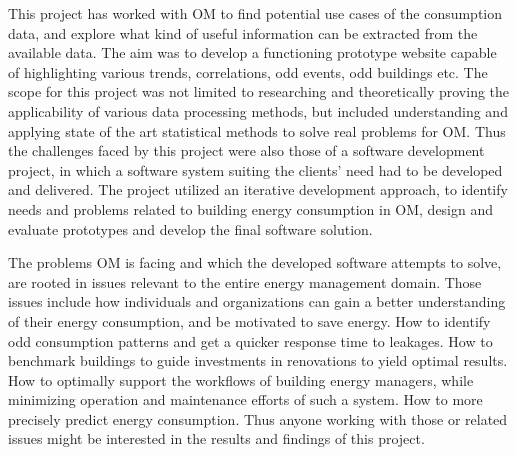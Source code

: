 This project has worked with OM to find potential use cases of the consumption data, and explore what kind of useful information can be extracted from the available data. The aim was to develop a functioning prototype website capable of highlighting various trends, correlations, odd events, odd buildings etc. The scope for this project was not limited to researching and theoretically proving the applicability of various data processing methods, but included understanding and applying state of the art statistical methods to solve real problems for OM. Thus the challenges faced by this project were also those of a software development project, in which a software system suiting the clients’ need had to be developed and delivered. The project utilized an iterative development approach, to identify needs and problems related to building energy consumption in OM, design and evaluate prototypes and develop the final software solution.

The problems OM is facing and which the developed software attempts to solve, are rooted in issues relevant to the entire energy management domain. Those issues include how individuals and organizations can gain a better understanding of their energy consumption, and be motivated to save energy. How to identify odd consumption patterns and get a quicker response time to leakages. How to benchmark buildings to guide investments in renovations to yield optimal results. How to optimally support the workflows of building energy managers, while minimizing operation and maintenance efforts of such a system. How to more precisely predict energy consumption. Thus anyone working with those or related issues might be interested in the results and findings of this project.